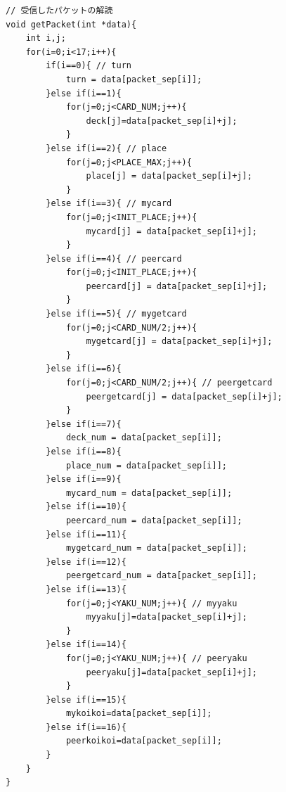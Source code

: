 \documentclass[a4j]{jarticle}
\begin{document}
\begin{lstlisting}[basicstyle=\ttfamily\footnotesize, frame=single,label=packetattach,caption=パケットの処理]
// 受信したパケットの解読
void getPacket(int *data){
    int i,j;
    for(i=0;i<17;i++){
        if(i==0){ // turn
            turn = data[packet_sep[i]];
        }else if(i==1){
            for(j=0;j<CARD_NUM;j++){
                deck[j]=data[packet_sep[i]+j];
            }               
        }else if(i==2){ // place
            for(j=0;j<PLACE_MAX;j++){
                place[j] = data[packet_sep[i]+j];
            }           
        }else if(i==3){ // mycard 
            for(j=0;j<INIT_PLACE;j++){
                mycard[j] = data[packet_sep[i]+j];
            }
        }else if(i==4){ // peercard
            for(j=0;j<INIT_PLACE;j++){
                peercard[j] = data[packet_sep[i]+j];
            }                
        }else if(i==5){ // mygetcard
            for(j=0;j<CARD_NUM/2;j++){
                mygetcard[j] = data[packet_sep[i]+j];
            }    
        }else if(i==6){
            for(j=0;j<CARD_NUM/2;j++){ // peergetcard
                peergetcard[j] = data[packet_sep[i]+j];
            }            
        }else if(i==7){
            deck_num = data[packet_sep[i]];
        }else if(i==8){
            place_num = data[packet_sep[i]];
        }else if(i==9){
            mycard_num = data[packet_sep[i]];
        }else if(i==10){
            peercard_num = data[packet_sep[i]];
        }else if(i==11){
            mygetcard_num = data[packet_sep[i]];
        }else if(i==12){
            peergetcard_num = data[packet_sep[i]];
        }else if(i==13){
            for(j=0;j<YAKU_NUM;j++){ // myyaku
                myyaku[j]=data[packet_sep[i]+j];
            }              
        }else if(i==14){
            for(j=0;j<YAKU_NUM;j++){ // peeryaku
                peeryaku[j]=data[packet_sep[i]+j];
            }                
        }else if(i==15){
            mykoikoi=data[packet_sep[i]];
        }else if(i==16){
            peerkoikoi=data[packet_sep[i]];
        }
    }    
}
    \end{lstlisting}
\end{document}
